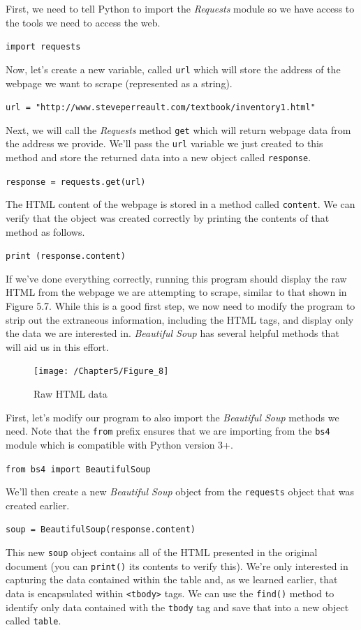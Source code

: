 \documentclass{book}
\begin{document}
	First, we need to tell Python to import the \textit{Requests} module so we have access to the tools we need to access the web. 
	
	\texttt{import requests}
	
	Now, let's create a new variable, called \texttt{url} which will store the address of the webpage we want to scrape (represented as a string).
	
	\texttt{url = "http://www.steveperreault.com/textbook/inventory1.html"}
	
	Next, we will call the \textit{Requests} method \texttt{get} which will return webpage data from the address we provide. We'll pass the \texttt{url} variable we just created to this method and store the returned data into a new object called \texttt{response}.
	
	\texttt{response = requests.get(url)}
	
	The HTML content of the webpage is stored in a method called \texttt{content}. We can verify that the object was created correctly by printing the contents of that method as follows.
	
	\texttt{print (response.content)}
	
	If we've done everything correctly, running this program should display the raw HTML from the webpage we are attempting to scrape, similar to that shown in Figure 5.7. While this is a good first step, we now need to modify the program to strip out the extraneous information, including the HTML tags, and display only the data we are interested in. \textit{Beautiful Soup} has several helpful methods that will aid us in this effort. 
	
\begin{figure}[h]
	\caption{Raw HTML data}
	\centering\texttt{[image: /Chapter5/Figure\_8]}
\end{figure}	
	
	First, let's modify our program to also import the \textit{Beautiful Soup} methods we need. Note that the \texttt{from} prefix ensures that we are importing from the \texttt{bs4} module which is compatible with Python version 3+.
	
	\texttt{from bs4 import BeautifulSoup}
	
	We'll then create a new \textit{Beautiful Soup} object from the \texttt{requests} object that was created earlier.
	
	\texttt{soup = BeautifulSoup(response.content)}
	
	This new \texttt{soup} object contains all of the HTML presented in the original document (you can \texttt{print()} its contents to verify this). We're only interested in capturing the data contained within the table and, as we learned earlier, that data is encapsulated within \texttt{<tbody>} tags. We can use the \texttt{find()} method to identify only data contained with the \texttt{tbody} tag and save that into a new object called \texttt{table}.
	
\end{document}

